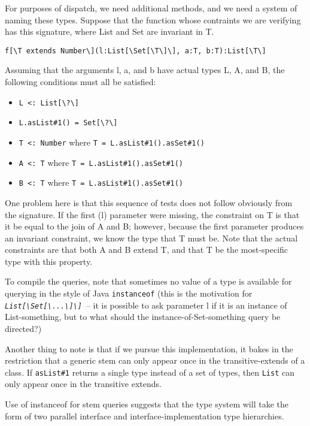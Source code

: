 \documentclass[11pt]{article}
\makeatletter
\newcommand{\jvm}[1]{{\tt #1}}
\newcommand{\ftt}[1]{{\tt\slshape{#1}}}
\def\BS{\textbackslash}
\newcommand{\slantverbatim}{\def\verbatim@font{\slshape\ttfamily\hyphenchar\font\m@ne\@noligs}}
\makeatother
\begin{document}
For purposes of dispatch, we need additional methods, and we need a system of naming these types.  Suppose that the function whose contraints we are verifying has this signature, where List and Set are invariant in T.
{\slantverbatim
\begin{verbatim}
f[\T extends Number\](l:List[\Set[\T\]\], a:T, b:T):List[\T\]
\end{verbatim}
}
Assuming that the arguments l, a, and b have actual types L, A, and B, the following conditions must all be satisfied:
\begin{itemize}
\item \verb+L <: List[\?\]+
\item \verb+L.asList#1() = Set[\?\]+
\item \verb+T <: Number+ where \verb+T = L.asList#1().asSet#1()+
\item \verb+A <: T+ where \verb+T = L.asList#1().asSet#1()+
\item \verb+B <: T+ where \verb+T = L.asList#1().asSet#1()+
\end{itemize}
One problem here is that this sequence of tests does not follow obviously from the signature.
If the first (l) parameter were missing, the constraint on T is that it be equal to the join of A and B; however, because the first parameter produces an invariant constraint, we know the type that T must be.  Note that the actual constraints are that both A and B extend T, and that T be the most-specific type with this property.

To compile the queries, note that sometimes no value of a type is available for querying in the style of Java \verb+instanceof+ (this is the motivation for \ftt{List[\BS Set[\BS ...\BS]\BS]}\ -- it is possible to ask parameter l if it is an instance of List-something, but to what should the instance-of-Set-something query be directed?)

Another thing to note is that if we pursue this implementation, it bakes in the restriction that a generic stem can only appear once in the transitive-extends of a class.  If \jvm{asList\#1} returns a single type instead of a set of types, then \jvm{List} can only appear once in the transitive extends.

Use of instanceof for stem queries suggests that the type system will take the form of two parallel interface and interface-implementation type hierarchies.
\end{document}
